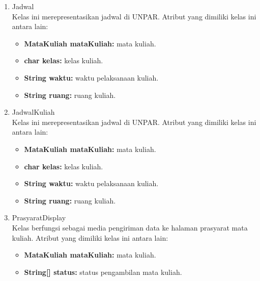 \begin{enumerate}
		\item Jadwal\\
		Kelas ini merepresentasikan jadwal di UNPAR. Atribut yang dimiliki kelas ini antara lain:
		\begin{itemize}
			\item \textbf{MataKuliah mataKuliah:} mata kuliah.
			\item \textbf{char kelas:} kelas kuliah.
			\item \textbf{String waktu:} waktu pelaksanaan kuliah.
			\item \textbf{String ruang:} ruang kuliah.
		\end{itemize}
		
		\item JadwalKuliah\\
		Kelas ini merepresentasikan jadwal di UNPAR. Atribut yang dimiliki kelas ini antara lain:
		\begin{itemize}
			\item \textbf{MataKuliah mataKuliah:} mata kuliah.
			\item \textbf{char kelas:} kelas kuliah.
			\item \textbf{String waktu:} waktu pelaksanaan kuliah.
			\item \textbf{String ruang:} ruang kuliah.
		\end{itemize}
		
		\item PrasyaratDisplay\\
		Kelas berfungsi sebagai media pengiriman data ke halaman prasyarat mata kuliah. Atribut yang dimiliki kelas ini antara lain:
		\begin{itemize}
			\item \textbf{MataKuliah mataKuliah:} mata kuliah.
			\item \textbf{String[] status:} status pengambilan mata kuliah.
		\end{itemize}
		

\end{enumerate}
